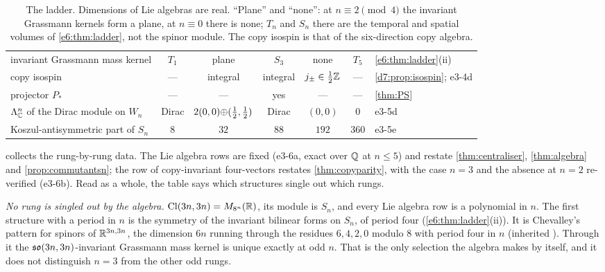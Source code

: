\begin{table}[t]
\begin{tabular}{@{}>{\raggedright\arraybackslash}p{4.5cm}ccccc>{\raggedright\arraybackslash}p{2.9cm}@{}}
invariant Grassmann mass kernel & $T_1$ & plane & $S_3$ & none & $T_5$ & \cref{e6:thm:ladder}(ii)\\
copy isospin & --- & integral & integral & $j_\pm\in\tfrac12\mathbb{Z}$ & --- & \cref{d7:prop:isospin}; e3-4d\\
projector $P_*$ & --- & --- & yes & --- & --- & \cref{thm:PS}\\
$\Lambda^n_{\mathbb{C}}$ of the Dirac module on $W_n$ & Dirac & $2(0,0){\oplus}(\tfrac12,\tfrac12)$ & Dirac & $(0,0)$ & $0$ & e3-5d\\
Koszul-antisymmetric part of $S_n$ & $8$ & $32$ & $88$ & $192$ & $360$ & e3-5e\\
\bottomrule
\end{tabular}
\caption{The ladder. Dimensions of Lie algebras are real. ``Plane'' and ``none'': at $n\equiv2\pmod4$ the invariant Grassmann kernels form a plane,
at $n\equiv0$ there is none; $T_n$ and $S_n$ there are the temporal and spatial volumes of \cref{e6:thm:ladder}, not the spinor module. The copy
isospin is that of the six-direction copy algebra.}
\label{e3:tab:ladder}
\end{table}

 collects the rung-by-rung data. The Lie algebra rows are fixed (e3-6a, exact over $\mathbb{Q}$ at $n\le5$) and restate
\cref{thm:centraliser}, \cref{thm:algebra} and \cref{prop:commutantsn}; the row of copy-invariant four-vectors restates \cref{thm:copyparity}, with
the case $n=3$ and the absence at $n=2$ re-verified (e3-6b). Read as a whole, the table says which structures single out which rungs.

\emph{No rung is singled out by the algebra.} $\mathrm{Cl}(3n,3n)=M_{8^n}(\mathbb{R})$, its module is $S_n$, and every Lie algebra row is a polynomial in $n$. The
first structure with a period in $n$ is the symmetry of the invariant bilinear forms on $S_n$, of period four (\cref{e6:thm:ladder}(ii)). It is
Chevalley's pattern for spinors of $\mathbb{R}^{3n,3n}$, the dimension $6n$ running through the residues $6,4,2,0$ modulo $8$ with period four in $n$
(inherited \cite{Chevalley54}). Through it the $\mathfrak{so}(3n,3n)$-invariant Grassmann mass kernel is unique exactly at odd $n$. That is the only
selection the algebra makes by itself, and it does not distinguish $n=3$ from the other odd rungs.

